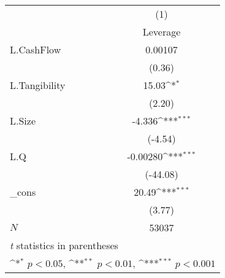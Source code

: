 {
\def\sym#1{\ifmmode^{#1}\else\(^{#1}\)\fi}
\begin{tabular}{l*{1}{c}}
\hline\hline
            &\multicolumn{1}{c}{(1)}\\
            &\multicolumn{1}{c}{Leverage}\\
\hline
L.CashFlow  &     0.00107         \\
            &      (0.36)         \\
[1em]
L.Tangibility&       15.03\sym{*}  \\
            &      (2.20)         \\
[1em]
L.Size      &      -4.336\sym{***}\\
            &     (-4.54)         \\
[1em]
L.Q         &    -0.00280\sym{***}\\
            &    (-44.08)         \\
[1em]
\_cons      &       20.49\sym{***}\\
            &      (3.77)         \\
\hline
\(N\)       &       53037         \\
\hline\hline
\multicolumn{2}{l}{\footnotesize \textit{t} statistics in parentheses}\\
\multicolumn{2}{l}{\footnotesize \sym{*} \(p<0.05\), \sym{**} \(p<0.01\), \sym{***} \(p<0.001\)}\\
\end{tabular}
}
